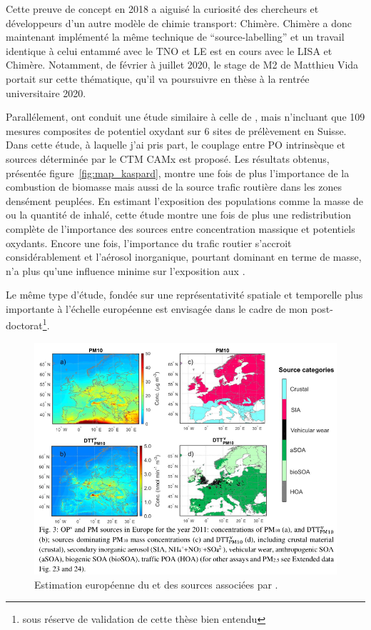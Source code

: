 Cette preuve de concept en 2018 a aiguisé la curiosité des chercheurs et développeurs
d'un autre modèle de chimie transport: Chimère. Chimère a donc maintenant implémenté la
même technique de ``source-labelling'' et un travail identique à celui entammé avec le
TNO et LE est en cours avec le LISA et Chimère. Notamment, de février à juillet 2020, le
stage de M2 de Matthieu Vida portait sur cette thématique, qu'il va poursuivre en thèse à
la rentrée universitaire 2020.

Parallélement, \cite{daellenbachSourcessubmitted} ont conduit une étude similaire à celle
de \cite{weberSourceinprep.}, mais n'incluant que 109 mesures composites de potentiel
oxydant sur 6 sites de prélèvement en Suisse. Dans cette étude, à laquelle j'ai pris
part, le couplage entre PO intrinsèque et sources déterminée par le CTM CAMx est proposé.
Les résultats obtenus, présentée figure~\ref{fig:map_kaspard}, montre une fois de plus
l'importance de la combustion de biomasse mais aussi de la source trafic routière dans
les zones densément peuplées. En estimant l'exposition des populations comme la masse de
\PMdix{} ou la quantité de \POv{} inhalé, cette étude montre une fois de plus une
redistribution complète de l'importance des sources entre concentration massique et
potentiels oxydants. Encore une fois, l'importance du trafic routier s'accroit
considérablement et l'aérosol inorganique, pourtant dominant en terme de masse, n'a plus
qu'une influence minime sur l'exposition aux \POv.

Le même type d'étude, fondée sur une représentativité spatiale et temporelle plus
importante à l'échelle européenne est envisagée dans le cadre de mon
post-doctorat\footnote{sous réserve de validation de cette thèse bien entendu}.

\begin{figure}[ht]
    \centering
    \includegraphics[width=0.8\linewidth]{figures/chapter05/map_kaspard.png}
    \caption{Estimation européenne du \PODTTv{} et des sources associées par
    \cite{daellenbachSourcessubmitted}.}%
    \label{fig:figures/chapter05/map_kaspard}
\end{figure}


